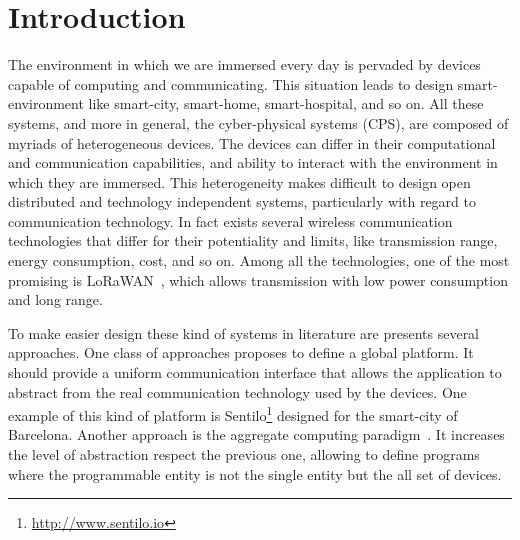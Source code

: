 \chapter{Introduction}
\label{chap:introduction}
The environment in which we are immersed every day is pervaded by devices capable of computing and communicating.
This situation leads to design smart-environment like smart-city, smart-home, smart-hospital, and so on.
All these systems, and more in general, the cyber-physical systems (CPS), are composed of myriads of heterogeneous devices.
The devices can differ in their computational and communication capabilities, and ability to interact with the environment in which they are immersed.
This heterogeneity makes difficult to design open distributed and technology independent systems, particularly with regard to communication technology.
In fact exists several wireless communication technologies that differ for their potentiality and limits, like transmission range, energy consumption, cost, and so on.
Among all the technologies, one of the most promising is \mbox{LoRaWAN}~\cite{loraalliancetechnicalcommittee2020}, which allows transmission with low power consumption and long range.

To make easier design these kind of systems in literature are presents several approaches.
One class of approaches proposes to define a global platform. 
It should provide a uniform communication interface that allows the application to abstract from the real communication technology used by the devices. One example of  this kind of platform is Sentilo\footnote{\href{http://www.sentilo.io}{http://www.sentilo.io}} designed for the smart-city of Barcelona.
% 
Another approach is the aggregate computing paradigm~\cite{BealIEEEComputer2015}.
It increases the level of abstraction respect the previous one, allowing to define programs where the programmable entity is not the single entity but the all set of devices.

